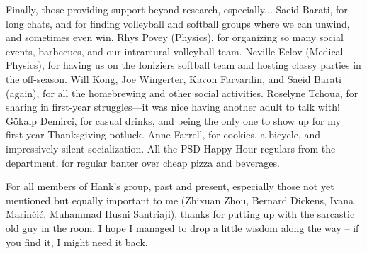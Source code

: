 Finally, those providing support beyond research, especially...
Saeid Barati, for long chats, and for finding volleyball and softball groups where we can unwind, and sometimes even win.
Rhys Povey (Physics), for organizing so many social events, barbecues, and our intramural volleyball team.
Neville Eclov (Medical Physics), for having us on the Ioniziers softball team and hosting classy parties in the off-season.
Will Kong, Joe Wingerter, Kavon Farvardin, and Saeid Barati (again), for all the homebrewing and other social activities.
Roselyne Tchoua, for sharing in first-year struggles---it was nice having another adult to talk with!
G{\"o}kalp Demirci, for casual drinks, and being the only one to show up for my first-year Thanksgiving potluck.
Anne Farrell, for cookies, a bicycle, and impressively silent socialization.
All the PSD Happy Hour regulars from the department, for regular banter over cheap pizza and beverages.

For all members of Hank's group, past and present, especially those not yet mentioned but equally important to me (Zhixuan Zhou, Bernard Dickens, Ivana Marin{\u c}i{\'c}, Muhammad Husni Santriaji), thanks for putting up with the sarcastic old guy in the room.
I hope I managed to drop a little wisdom along the way -- if you find it, I might need it back.

